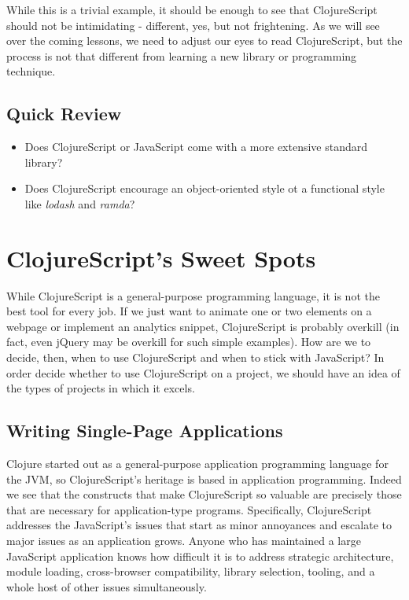 \documentclass[10pt,twoside,openright]{memoir}
\begin{document}
While this is a trivial example, it should be enough to see that
ClojureScript should not be intimidating - different, yes, but not
frightening. As we will see over the coming lessons, we need to adjust
our eyes to read ClojureScript, but the process is not that different
from learning a new library or programming technique.

\subsection{Quick Review}

\begin{itemize}
\tightlist
\item
  Does ClojureScript or JavaScript come with a more extensive standard
  library?
\item
  Does ClojureScript encourage an object-oriented style ot a functional
  style like \emph{lodash} and \emph{ramda}?
\end{itemize}

\section{ClojureScript's Sweet Spots}

While ClojureScript is a general-purpose programming language, it is not
the best tool for every job. If we just want to animate one or two
elements on a webpage or implement an analytics snippet, ClojureScript
is probably overkill (in fact, even jQuery may be overkill for such
simple examples). How are we to decide, then, when to use ClojureScript
and when to stick with JavaScript? In order decide whether to use
ClojureScript on a project, we should have an idea of the types of
projects in which it excels.

\subsection{Writing Single-Page Applications}

Clojure started out as a general-purpose application programming
language for the JVM, so ClojureScript's heritage is based in
application programming. Indeed we see that the constructs that make
ClojureScript so valuable are precisely those that are necessary for
application-type programs. Specifically, ClojureScript addresses the
JavaScript's issues that start as minor annoyances and escalate to major
issues as an application grows. Anyone who has maintained a large
JavaScript application knows how difficult it is to address strategic
architecture, module loading, cross-browser compatibility, library
selection, tooling, and a whole host of other issues simultaneously.
\end{document}
